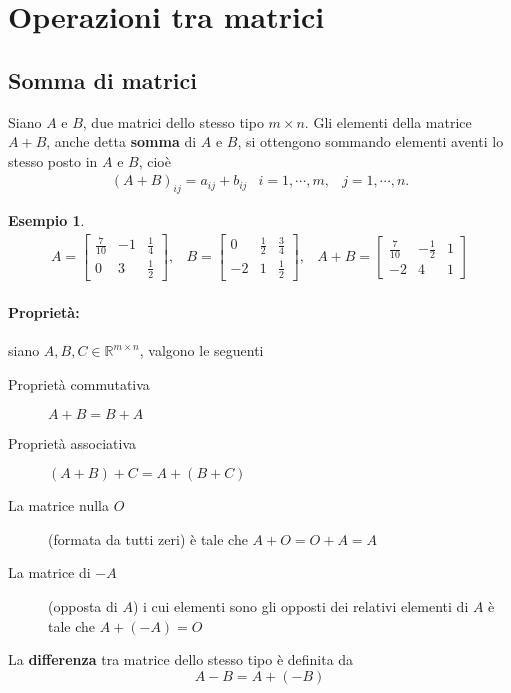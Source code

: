 \documentclass{book}
\theoremstyle{definition}
\newtheorem{es}{Esempio}[section]
\theoremstyle{plain}
\begin{document}
\section{Operazioni tra matrici}
\label{sec:opmatrici}

\subsection{Somma di matrici}
\label{sec:somdimatrici}

Siano $A$ e $B$, due matrici dello stesso tipo $m\times n$. Gli elementi
della matrice $A+B$, anche detta \textbf{somma} di $A$ e $B$, si ottengono
sommando elementi aventi lo stesso posto in $A$ e $B$, cioè
\begin{eqnarray*}
  (A+B)_{ij}=a_{ij}+b_{ij} & i=1,\cdots,m, & j=1,\cdots,n.
\end{eqnarray*}
\begin{es}
  \label{es:sommatrice1}
  \begin{eqnarray*}
    A=
    \begin{bmatrix}
      \frac{7}{10} & -1 & \frac{1}{4}\\
      0 & 3 & \frac{1}{2}
    \end{bmatrix}, & B=
                    \begin{bmatrix}
                      0 & \frac{1}{2} & \frac{3}{4}\\
                      -2 & 1 & \frac{1}{2}
                    \end{bmatrix}, & A+B=
                                    \begin{bmatrix}
                                      \frac{7}{10} & -\frac{1}{2} & 1\\
                                      -2 & 4 & 1
                                    \end{bmatrix}
  \end{eqnarray*}
\end{es}

\paragraph{Proprietà:}

siano $A,B,C\in \mathds{R}^{m\times n}$, valgono le seguenti
\begin{description}
\item[Proprietà commutativa] $A+B=B+A$
\item[Proprietà associativa] $(A+B)+C=A+(B+C)$
\item[La matrice nulla $O$] (formata da tutti zeri) è tale che
  $A+O=O+A=A$ 
\item[La matrice di $-A$] (opposta di $A$) i cui elementi sono gli opposti
  dei relativi elementi di $A$ è tale che $A+(-A)=O$
\end{description}
La \textbf{differenza} tra matrice dello stesso tipo è definita da
\begin{equation*}
  A-B=A+(-B)
\end{equation*}
\end{document}
